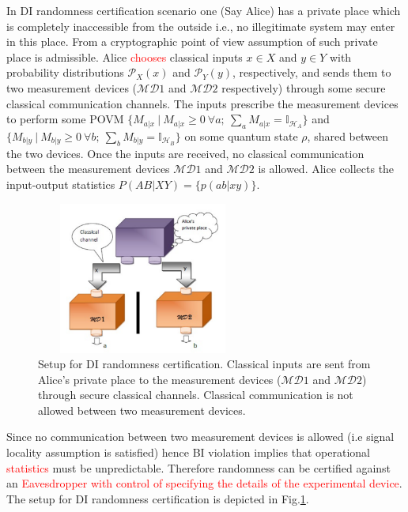 \documentclass[doublecol,linenumbers]{epl2} %
\begin{document}
In DI randomness certification scenario one (Say Alice) has a private place which is completely inaccessible from the outside i.e., no illegitimate system may enter in this place. From a cryptographic point of view assumption of such private place is admissible. Alice \textcolor{red}{chooses} classical inputs $x\in X$ and $y\in Y$ with probability distributions $\mathcal{P}_X(x)$ and $\mathcal{P}_Y(y)$, respectively, and sends them to two measurement devices ($\mathcal{MD}1$ and $\mathcal{MD}2$ respectively) through some secure classical communication channels. The inputs prescribe the  measurement devices to perform some POVM $\{M_{a|x}~|~M_{a|x}\ge 0~\forall a;~\sum_{a}M_{a|x}=\mathbb{I}_{\mathcal{H}_A}\}$ and $\{M_{b|y}~|~M_{b|y}\ge 0~\forall b;~\sum_{b}M_{b|y}=\mathbb{I}_{\mathcal{H}_B}\}$ on some quantum state $\rho$, shared between the two devices. Once the inputs are received, no classical communication between the measurement devices $\mathcal{MD}1$ and $\mathcal{MD}2$ is allowed. Alice collects the input-output statistics $P(AB|XY)=\{p(ab|xy)\}$. 
\begin{figure}[b]
\centering
\includegraphics[height=5cm,width=7cm]{fig1.pdf}
\caption{Setup for DI randomness certification. Classical inputs are sent from Alice's private place to the measurement devices ($\mathcal{MD}1$ and $\mathcal{MD}2$) through secure classical channels. Classical communication is not allowed between two measurement devices.}\label{fig1}
\end{figure}
Since no communication between two measurement devices is allowed (i.e signal locality assumption is satisfied) hence BI violation implies that operational \textcolor{red}{statistics} must be unpredictable. Therefore randomness can be certified against an \textcolor{red}{Eavesdropper with control of specifying the details of the experimental device}. The setup for DI randomness certification is depicted in Fig.\ref{fig1}. 
\end{document}
